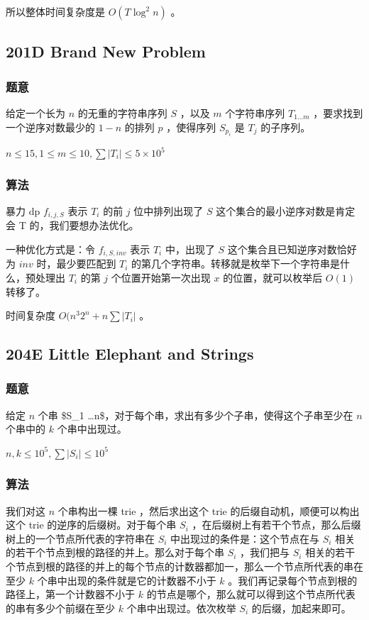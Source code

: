 \documentclass[11pt]{article}
\begin{document}
    所以整体时间复杂度是 $O(T \log^2 n)$ 。
\subsection{201D  Brand New Problem}
\label{sec-11-7}
\subsubsection{题意}
\label{sec-11-7-1}

    给定一个长为 $n$ 的无重的字符串序列 $S$ ，以及 $m$ 个字符串序列 $T_{1 \dots m}$ ，要求找到一个逆序对数最少的 $1 - n$ 的排列 $p$ ，使得序列 $S_{p_i}$ 是 $T_j$ 的子序列。

    $n \leq 15, 1 \leq m \leq 10, \sum |T_i| \leq 5 \times 10^5$ 
\subsubsection{算法}
\label{sec-11-7-2}

    暴力 dp $f_{i, j, S}$ 表示 $T_i$ 的前 $j$ 位中排列出现了 $S$ 这个集合的最小逆序对数是肯定会 T 的，我们要想办法优化。

    一种优化方式是：令 $f_{i, S, inv}$ 表示 $T_i$ 中，出现了 $S$ 这个集合且已知逆序对数恰好为 $inv$ 时，最少要匹配到 $T_i$ 的第几个字符串。转移就是枚举下一个字符串是什么，预处理出 $T_i$ 的第 $j$ 个位置开始第一次出现 $x$ 的位置，就可以枚举后 $O(1)$ 转移了。

    时间复杂度 $O(n^3 2^n + n \sum |T_i|$ 。
\subsection{204E  Little Elephant and Strings}
\label{sec-11-8}
\subsubsection{题意}
\label{sec-11-8-1}

    给定 $n$ 个串 \$S\_{}{1 \dots n}\$，对于每个串，求出有多少个子串，使得这个子串至少在 $n$ 个串中的 $k$ 个串中出现过。

    $n, k \leq 10^5, \sum |S_i| \leq 10^5$
\subsubsection{算法}
\label{sec-11-8-2}

    我们对这 $n$ 个串构出一棵 trie ，然后求出这个 trie 的后缀自动机，顺便可以构出这个 trie 的逆序的后缀树。对于每个串 $S_i$ ，在后缀树上有若干个节点，那么后缀树上的一个节点所代表的字符串在 $S_i$ 中出现过的条件是：这个节点在与 $S_i$ 相关的若干个节点到根的路径的并上。那么对于每个串 $S_i$ ，我们把与 $S_i$ 相关的若干个节点到根的路径的并上的每个节点的计数器都加一，那么一个节点所代表的串在至少 $k$ 个串中出现的条件就是它的计数器不小于 $k$ 。我们再记录每个节点到根的路径上，第一个计数器不小于 $k$ 的节点是哪个，那么就可以得到这个节点所代表的串有多少个前缀在至少 $k$ 个串中出现过。依次枚举 $S_i$ 的后缀，加起来即可。
\end{document}
